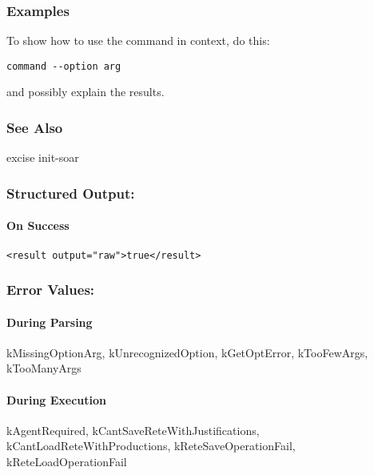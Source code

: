 \subsubsection*{Examples}
 To show how to use the command in context, do this: \begin{verbatim}
command --option arg
\end{verbatim}
 and possibly explain the results. 
\subsubsection*{See Also}
 excise init-soar
\subsubsection*{Structured Output:}
\paragraph*{On Success}
\begin{verbatim}
<result output="raw">true</result>
\end{verbatim}
\subsubsection*{Error Values:}
\paragraph*{During Parsing}
 kMissingOptionArg, kUnrecognizedOption, kGetOptError, kTooFewArgs, kTooManyArgs
\paragraph*{During Execution}
kAgentRequired, kCantSaveReteWithJustifications, kCantLoadReteWithProductions, kReteSaveOperationFail, kReteLoadOperationFail
